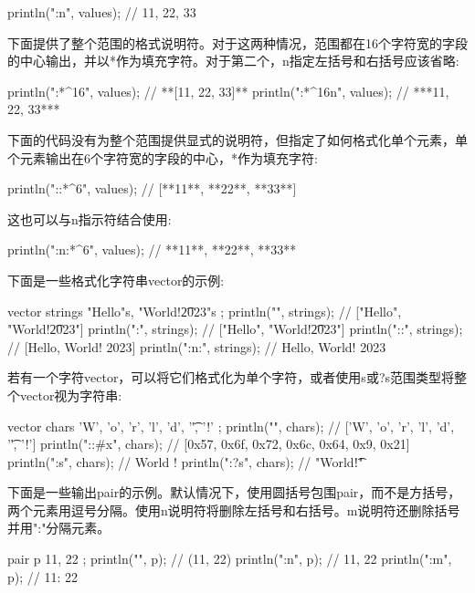 \begin{cpp}
println("{{{:n}}}", values); // {11, 22, 33}
\end{cpp}

下面提供了整个范围的格式说明符。对于这两种情况，范围都在16个字符宽的字段的中心输出，并以*作为填充字符。对于第二个，n指定左括号和右括号应该省略:

\begin{cpp}
println("{:*^16}", values); // **[11, 22, 33]**
println("{:*^16n}", values); // ***11, 22, 33***
\end{cpp}

下面的代码没有为整个范围提供显式的说明符，但指定了如何格式化单个元素，单个元素输出在6个字符宽的字段的中心，*作为填充字符:

\begin{cpp}
println("{::*^6}", values); // [**11**, **22**, **33**]
\end{cpp}

这也可以与n指示符结合使用:

\begin{cpp}
println("{:n:*^6}", values); // **11**, **22**, **33**
\end{cpp}

下面是一些格式化字符串vector的示例:

\begin{cpp}
vector strings { "Hello"s, "World!\t2023"s };
println("{}", strings);     // ["Hello", "World!\t2023"]
println("{:}", strings);    // ["Hello", "World!\t2023"]
println("{::}", strings);   // [Hello, World!   2023]
println("{:n:}", strings);  // Hello, World!   2023
\end{cpp}

若有一个字符vector，可以将它们格式化为单个字符，或者使用s或?s范围类型将整个vector视为字符串:

\begin{cpp}
vector chars { 'W', 'o', 'r', 'l', 'd', '\t', '!' };
println("{}", chars);       // ['W', 'o', 'r', 'l', 'd', '\t', '!']
println("{::#x}", chars);   // [0x57, 0x6f, 0x72, 0x6c, 0x64, 0x9, 0x21]
println("{:s}", chars);     // World    !
println("{:?s}", chars);    // "World\t!"
\end{cpp}

下面是一些输出pair的示例。默认情况下，使用圆括号包围pair，而不是方括号，两个元素用逗号分隔。使用n说明符将删除左括号和右括号。m说明符还删除括号并用":"分隔元素。

\begin{cpp}
pair p { 11, 22 };
println("{}", p);     // (11, 22)
println("{:n}", p);   // 11, 22
println("{:m}", p);   // 11: 22
\end{cpp}

